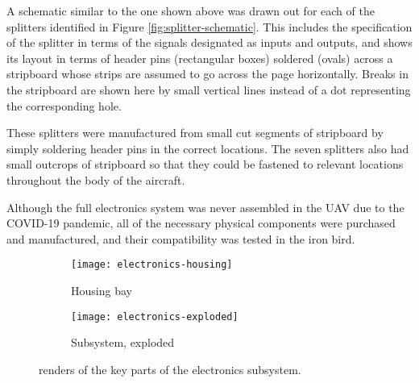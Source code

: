 \documentclass[../../main.tex]{subfiles}
\begin{document}
A schematic similar to the one shown above was drawn out for each of the splitters identified in Figure \ref{fig:splitter-schematic}.
This includes the specification of the splitter in terms of the signals designated as inputs and outputs, and shows its layout in terms of header pins (rectangular boxes) soldered (ovals) across a stripboard whose strips are assumed to go across the page horizontally.
Breaks in the stripboard are shown here by small vertical lines instead of a dot representing the corresponding hole. 

These splitters were manufactured from small cut segments of stripboard by simply soldering header pins in the correct locations.
The seven splitters also had small outcrops of stripboard so that they could be fastened to relevant locations throughout the body of the aircraft. 


Although the full electronics system was never assembled in the UAV due to the COVID-19 pandemic, all of the necessary physical components were purchased and manufactured, and their compatibility was tested in the iron bird. 


\begin{figure}[H]
    \centering
    \begin{subfigure}[b]{0.49\columnwidth}
        \centering
        \texttt{[image: electronics-housing]}
        \caption{Housing bay}
        \label{fig:electronics-subsystem:bay}
    \end{subfigure}
    \hfill
    \begin{subfigure}[b]{0.49\columnwidth}
        \centering
        \texttt{[image: electronics-exploded]}
        \caption{Subsystem, exploded}
        \label{fig:electronics-subsystem:exploded}
    \end{subfigure}
    
    \caption{renders of the key parts of the electronics subsystem.}
    \label{fig:electronics-subsystem}
\end{figure} 

\end{document}
